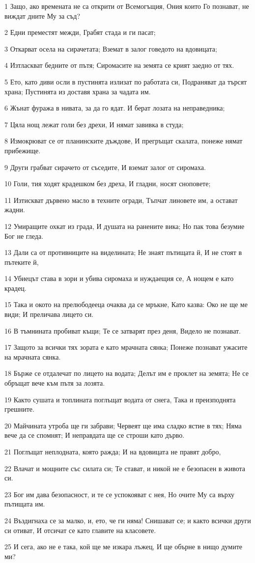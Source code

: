 \par 1 Защо, ако времената не са открити от Всемогъщия, Ония които Го познават, не виждат дните Му за съд?
\par 2 Едни преместят межди, Грабят стада и ги пасат;
\par 3 Откарват осела на сирачетата; Вземат в залог говедото на вдовицата;
\par 4 Изтласкват бедните от пътя; Сиромасите на земята се крият заедно от тях.
\par 5 Ето, като диви осли в пустинята излизат по работата си, Подраняват да търсят храна; Пустинята из доставя храна за чадата им.
\par 6 Жънат фуража в нивата, за да го ядат. И берат лозата на неправедника;
\par 7 Цяла нощ лежат голи без дрехи, И нямат завивка в студа;
\par 8 Измокрюват се от планинските дъждове, И прегръщат скалата, понеже нямат прибежище.
\par 9 Други грабват сирачето от съседите, И вземат залог от сиромаха.
\par 10 Голи, тия ходят крадешком без дреха, И гладни, носят сноповете;
\par 11 Изтискват дървено масло в техните огради, Тъпчат линовете им, а остават жадни.
\par 12 Умиращите охкат из града, И душата на ранените вика; Но пак това безумие Бог не гледа.
\par 13 Дали са от противниците на виделината; Не знаят пътищата й, И не стоят в пътеките й,
\par 14 Убиецът става в зори и убива сиромаха и нуждаещия се, А нощем е като крадец.
\par 15 Така и окото на прелюбодееца очаква да се мръкне, Като казва: Око не ще ме види; И преличава лицето си.
\par 16 В тъмнината пробиват къщи; Те се затварят през деня, Видело не познават.
\par 17 Защото за всички тях зората е като мрачната сянка; Понеже познават ужасите на мрачната сянка.
\par 18 Бърже се отдалечат по лицето на водата; Делът им е проклет на земята; Не се обръщат вече към пътя за лозята.
\par 19 Както сушата и топлината поглъщат водата от снега, Така и преизподнята грешните.
\par 20 Майчината утроба ще ги забрави; Червеят ще има сладко ястие в тях; Няма вече да се спомнят; И неправдата ще се строши като дърво.
\par 21 Поглъщат неплодната, която ражда; И на вдовицата не правят добро,
\par 22 Влачат и мощните със силата си; Те стават, и никой не е безопасен в живота си.
\par 23 Бог им дава безопасност, и те се успокояват с нея, Но очите Му са върху пътищата им.
\par 24 Въздигнаха се за малко, и, ето, че ги няма! Снишават се; и както всички други си отиват, И отсичат се като главите на класовете.
\par 25 И сега, ако не е така, кой ще ме изкара лъжец, И ще обърне в нищо думите ми?

